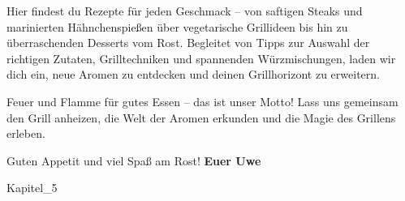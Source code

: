 \documentclass[pdftext, bcor=7mm, ngerman]{scrbook}
\begin{document}
Hier findest du Rezepte für jeden Geschmack – von saftigen Steaks und marinierten Hähnchenspießen über vegetarische Grillideen bis 
hin zu überraschenden Desserts vom Rost. Begleitet von Tipps zur Auswahl der richtigen Zutaten, Grilltechniken und spannenden 
Würzmischungen, laden wir dich ein, neue Aromen zu entdecken und deinen Grillhorizont zu erweitern.

Feuer und Flamme für gutes Essen – das ist unser Motto! Lass uns gemeinsam den Grill anheizen, die Welt der Aromen erkunden und die 
Magie des Grillens erleben.

Guten Appetit und viel Spaß am Rost!
\newline
\textbf{Euer Uwe}

\tableofcontents

\mainmatter
 {Kapitel_5}%
 
\end{document}

